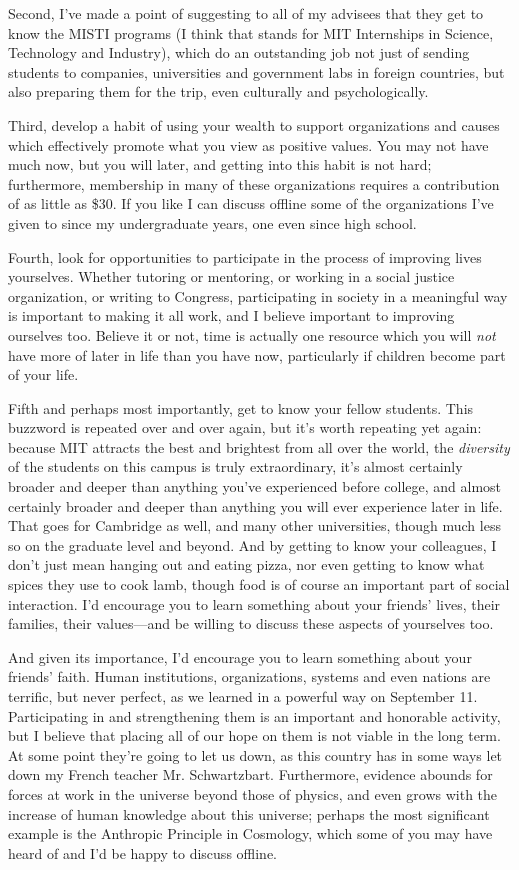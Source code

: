 \documentclass{report}
\begin{document}
Second, I've made a point of suggesting to all of my advisees that they get to
know the MISTI programs (I think that stands for MIT Internships in Science,
Technology and Industry), which do an outstanding job not just of sending
students to companies, universities and government labs in foreign countries,
but also preparing them for the trip, even culturally and psychologically.

Third, develop a habit of using your wealth to support organizations and causes
which effectively promote what you view as positive values.  You may not have
much now, but you will later, and getting into this habit is not hard;
furthermore, membership in many of these organizations requires a contribution
of as little as \$30.  If you like I can discuss offline some of the
organizations I've given to since my undergraduate years, one even since high
school.

Fourth, look for opportunities to participate in the process of improving lives
yourselves.  Whether tutoring or mentoring, or working in a social justice
organization, or writing to Congress, participating in society in a meaningful
way is important to making it all work, and I believe important to improving
ourselves too.  Believe it or not, time is actually one resource which you will
{\em not} have more of later in life than you have now, particularly if
children become part of your life.

Fifth and perhaps most importantly, get to know your fellow students.  This
buzzword is repeated over and over again, but it's worth repeating yet again:
because MIT attracts the best and brightest from all over the world, the {\em
  diversity} of the students on this campus is truly extraordinary, it's almost
certainly broader and deeper than anything you've experienced before college,
and almost certainly broader and deeper than anything you will ever experience
later in life.  That goes for Cambridge as well, and many other universities,
though much less so on the graduate level and beyond.  And by getting to know
your colleagues, I don't just mean hanging out and eating pizza, nor even
getting to know what spices they use to cook lamb, though food is of course an
important part of social interaction.  I'd encourage you to learn something
about your friends' lives, their families, their values---and be willing to
discuss these aspects of yourselves too.

And given its importance, I'd encourage you to learn something about your
friends' faith.  Human institutions, organizations, systems and even nations
are terrific, but never perfect, as we learned in a powerful way on September
11.  Participating in and strengthening them is an important and honorable
activity, but I believe that placing all of our hope on them is not viable in
the long term.  At some point they're going to let us down, as this country has
in some ways let down my French teacher Mr. Schwartzbart.  Furthermore,
evidence abounds for forces at work in the universe beyond those of physics,
and even grows with the increase of human knowledge about this universe;
perhaps the most significant example is the Anthropic Principle in Cosmology,
which some of you may have heard of and I'd be happy to discuss offline.
\end{document}
